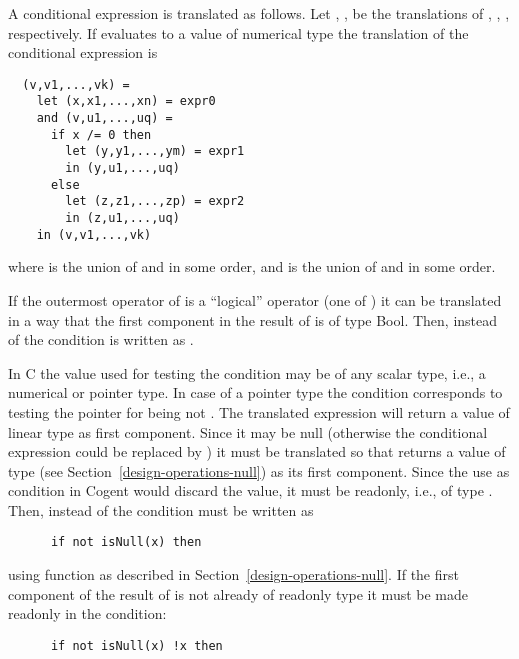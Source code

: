 A conditional expression  is translated as follows. Let , 
,  be the translations of 
, , , respectively.
If  evaluates to a value of numerical type the translation of the conditional expression is 
\begin{verbatim}
  (v,v1,...,vk) = 
    let (x,x1,...,xn) = expr0
    and (v,u1,...,uq) =
      if x /= 0 then 
        let (y,y1,...,ym) = expr1 
        in (y,u1,...,uq)
      else
        let (z,z1,...,zp) = expr2
        in (z,u1,...,uq)
    in (v,v1,...,vk) 
\end{verbatim}
where  is the union of  and  in some order, and 
 is the union of  and  in some order.

If the outermost operator of  is a ``logical'' operator (one of \code{<, <=, >, >=, ==, !=, \&\&, ||})
it can be translated in a way that the first component in the result of  is of type Bool.
Then, instead of  the condition is written as .

In C the value used for testing the condition may be of any scalar type, i.e., a numerical or pointer type.
In case of a pointer type the condition corresponds to testing the pointer for being not .
The translated expression  will return a value of linear type as first component. Since it
may be null (otherwise the conditional expression could be replaced by ) it must be translated
so that  returns a value of type  (see Section~\ref{design-operations-null})
as its first component. Since the use as condition in Cogent would discard the value, it must be readonly,
i.e., of type . Then, instead of  the condition must be written as
\begin{verbatim}
      if not isNull(x) then 
\end{verbatim}
using function  as described in Section~\ref{design-operations-null}. If the first component
of the result of  is not already of readonly type it must be made readonly in the condition:
\begin{verbatim}
      if not isNull(x) !x then 
\end{verbatim}

